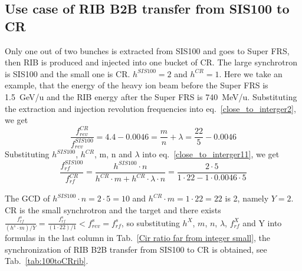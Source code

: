 \subsection{Use case of RIB B2B transfer from SIS100 to CR} 
Only one out of two bunches is extracted from SIS100 and goes to Super FRS, then RIB is produced and injected into one bucket of CR. The large synchrotron is SIS100 and the small one is CR. $h^{\mathit{SIS100}}=2$ and $h^{\mathit{CR}}=1$. Here we take an example, that the energy of the heavy ion beam before the Super FRS is \SI{1.5}{GeV/\atomicmassunit} and the RIB energy after the Super FRS is \SI{740}{MeV/\atomicmassunit}. Substituting the extraction and injection revolution frequencies into eq.~\ref{close_to_interger2}, we get
\begin{equation} 
\frac{f_{\mathit{rev}}^{\mathit{CR}}}{f_{\mathit{rev}}^{\mathit{SIS100}}}=4.4-0.0046=\frac{m}{n}+ \lambda=\frac{22}{5}-0.0046
\end{equation}
Substituting $h^{\mathit{SIS100}}$, $h^{\mathit{CR}}$, m, n and $\lambda$ into eq.~\ref{close_to_interger11}, we get
\begin{equation} 
\frac{f_{\mathit{rf}}^{\mathit{SIS100}}}{f_{\mathit{rf}}^{\mathit{CR}}}=\frac{h^{\mathit{SIS100}}\cdot n}{h^{\mathit{CR}} \cdot m+ h^{\mathit{CR}} \cdot\lambda\cdot n}=\frac{2\cdot 5}{1 \cdot 22- 1 \cdot0.0046\cdot 5}
\end{equation}

The GCD of $h^{\mathit{SIS100}}\cdot n=2\cdot5=10$ and $h^{\mathit{CR}} \cdot m=1\cdot 22=22$ is 2, namely $Y=2$. CR is the small synchrotron and the target and there exists $\frac{f_{\mathit{rf}}^{s}}{(h^s\cdot m)/Y}=\frac{f_{\mathit{rf}}^{s}}{(1\cdot 22)/1}<f_{\mathit{rev}}^{s}=f_{\mathit{rf}}^{s}$, so substituting $h^X$, $m$, $n$, $\lambda$, $f_{\mathit{rf}}^{X}$ and Y into formulas in the last column in Tab.~\ref{Cir ratio far from integer small}, the synchronization of RIB B2B transfer from SIS100 to CR is obtained, see Tab.~\ref{tab:100toCRrib}.


